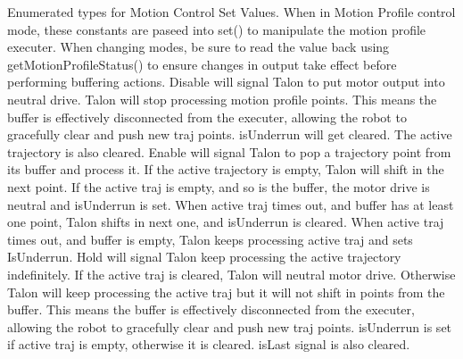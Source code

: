 Enumerated types for Motion Control Set Values. When in Motion Profile control mode, these constants are paseed into set() to manipulate the motion profile executer. When changing modes, be sure to read the value back using get\+Motion\+Profile\+Status() to ensure changes in output take effect before performing buffering actions. Disable will signal Talon to put motor output into neutral drive. Talon will stop processing motion profile points. This means the buffer is effectively disconnected from the executer, allowing the robot to gracefully clear and push new traj points. is\+Underrun will get cleared. The active trajectory is also cleared. Enable will signal Talon to pop a trajectory point from it\textquotesingle{}s buffer and process it. If the active trajectory is empty, Talon will shift in the next point. If the active traj is empty, and so is the buffer, the motor drive is neutral and is\+Underrun is set. When active traj times out, and buffer has at least one point, Talon shifts in next one, and is\+Underrun is cleared. When active traj times out, and buffer is empty, Talon keeps processing active traj and sets Is\+Underrun. Hold will signal Talon keep processing the active trajectory indefinitely. If the active traj is cleared, Talon will neutral motor drive. Otherwise Talon will keep processing the active traj but it will not shift in points from the buffer. This means the buffer is effectively disconnected from the executer, allowing the robot to gracefully clear and push new traj points. is\+Underrun is set if active traj is empty, otherwise it is cleared. is\+Last signal is also cleared.

